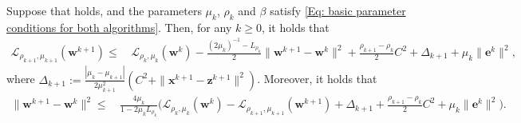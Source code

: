 \documentclass[10pt,a4paper]{amsart}
\newcommand{\be}{\bm{e}}
\newcommand{\bw}{\bm{w}}
\newcommand{\bx}{\bm{x}}
\newcommand{\bz}{\bm{z}}
\newcommand{\calL}{\mathcal{L}}
\begin{document}
\begin{lemma}
    \label{Lemma: approximate-sufficient-descent}
    Suppose that 
    holds, and the parameters $\mu_{k}$, $\rho_{k}$ and $\beta$ satisfy \eqref{Eq: basic parameter conditions for both algorithms}.
    Then, for any $k \geq 0$, it holds that
    \begin{align}
        \label{eq:approximate-sufficient-descent}
        \calL_{\rho_{k+1}, \mu_{k+1}}(\bw^{k+1}) \leq&\, \calL_{\rho_k, \mu_k}(\bw^{k}) - \frac{(2\mu_{k})^{-1}- L_{\rho_k}}{2}\| \bw^{k+1}- \bw^{k}\|^{2} + \frac{\rho_{k+1}- \rho_{k}}{2}C^{2} + \Delta_{k+1} +  \mu_{k}\| \be^{k}\|^{2},
    \end{align}
where $\Delta_{k+1}
:= \frac{|\mu_{k}-\mu_{k+1}|}{2\mu_{k+1}^2}
(C^{2} + \|\bx^{k+1}-\bz^{k+1}\|^{2})$. Moreover, it holds that
\begin{align}
\label{eq:sequence-residual-bound}
\| \bw^{k+1}- \bw^{k}\|^{2}
\leq&\, \frac{4 \mu_{k}}{1 - 2 \mu_{k}L_{\rho_k}}
   \bigl(
      \calL_{\rho_k, \mu_k}(\bw^{k})
      - \calL_{\rho_{k+1}, \mu_{k+1}}(\bw^{k+1})
      + \Delta_{k+1} + \frac{\rho_{k+1}- \rho_{k}}{2}C^{2}
      + \mu_{k}\| \be^{k}\|^{2}
   \bigr).
\end{align}
\end{lemma}
\end{document}
